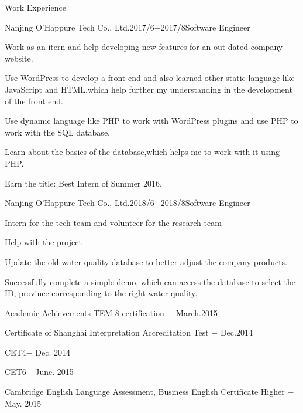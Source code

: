\documentclass{resume} %
\begin{document}
\begin{rSection}{Work Experience}
\begin{rSubsection}{Nanjing O’Happure Tech Co., Ltd.}{2017/6$-$2017/8}{Software Engineer}{}
\item Work as an itern and help developing new features for an out-dated company website.
\item Use WordPress to develop a front end and also learned other static language like JavaScript and HTML,which help further my understanding in the development of the front end. 
\item Use dynamic language like PHP to work with WordPress plugins and use PHP to work with the SQL database.
\item Learn about the basics of the database,which helps me to work with it using PHP.
\item Earn the title: Best Intern of Summer 2016.
\end{rSubsection}
\begin{rSubsection}{Nanjing O’Happure Tech Co., Ltd.}{2018/6$-$2018/8}{Software Engineer}{}
\item Intern for the tech team and volunteer for the research team 
\item Help with the project 
\item Update the old water quality database to better adjust the company products.
\item Successfully complete a simple demo, which can access the database to select the ID, province corresponding to the right water quality.
\end{rSubsection}
\end{rSection}
\begin{rSection}{Academic Achievements}
TEM 8 certification $-$ March.2015
\item Certificate of Shanghai Interpretation Accreditation Test $-$ Dec.2014
\item CET4$-$ Dec. 2014
\item CET6$-$ June. 2015
\item Cambridge English Language Assessment, Business English Certificate Higher $-$May. 2015
\end{rSection}
\newpage
\end{document}
